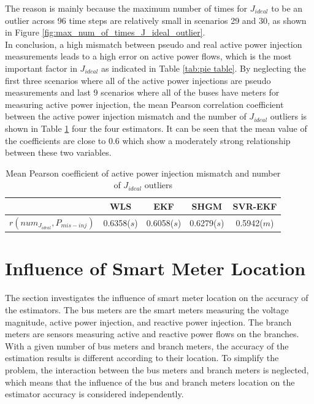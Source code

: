 The reason is mainly because the maximum number of times for $J_{ideal}$ to be an outlier across 96 time steps are relatively small in scenarios 29 and 30, as shown in Figure \ref{fig:max_num_of_times_J_ideal_outlier}.
\bigskip
\\In conclusion, a high mismatch between pseudo and real active power injection measurements leads to a high error on active power flows, which is the most important factor in $J_{ideal}$ as indicated in Table \ref{tab:pie table}. By neglecting the first three scenarios where all of the active power injections are pseudo measurements and last 9 scenarios where all of the buses have meters for measuring active power injection, the mean Pearson correlation coefficient between the active power injection mismatch and the number of $J_{ideal}$ outliers is shown in Table \ref{tab:pearson_J_ideal} four the four estimators. It can be seen that the mean value of the coefficients are close to 0.6 which show a moderately strong relationship between these two variables.
    \begin{table}[!h]
        \centering
        \begin{tabular}{c|c|c|c|c}
             & WLS & EKF & SHGM & SVR-EKF\\ \hline
            $r(num_{J_{ideal}},P_{mis-inj})$ & 0.6358($s$) & 0.6058($s$) & 0.6279($s$) &  0.5942($m$)\\
        \end{tabular}
        \caption{Mean Pearson coefficient of active power injection mismatch and number of $J_{ideal}$ outliers}
        \label{tab:pearson_J_ideal}
    \end{table}
    


\section{Influence of Smart Meter Location}
\label{sec:analysis_meter_location}
The section investigates the influence of smart meter location on the accuracy of the estimators. The bus meters are the smart meters measuring the voltage magnitude, active power injection, and reactive power injection. The branch meters are sensors measuring active and reactive power flows on the branches. With a given number of bus meters and branch meters, the accuracy of the estimation results is different according to their location. To simplify the problem, the interaction between the bus meters and branch meters is neglected, which means that the influence of the bus and branch meters location on the estimator accuracy is considered independently. 
